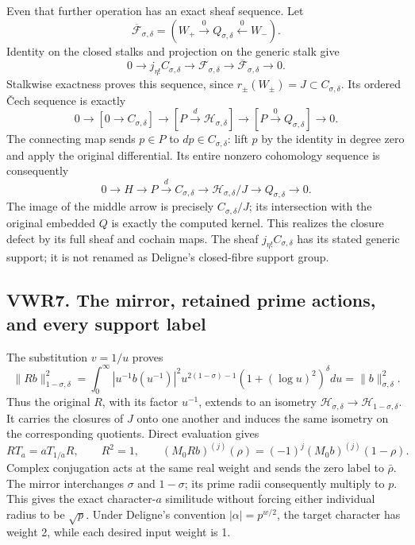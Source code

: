 Even that further operation has an exact sheaf sequence. Let \[
\overline{\mathcal F}_{\sigma,\delta}
=(W_+\xrightarrow0 Q_{\sigma,\delta}\xleftarrow0 W_-).
\] Identity on the closed stalks and projection on the generic stalk
give \[
0\longrightarrow j_{\eta!}C_{\sigma,\delta}
\longrightarrow\mathcal F_{\sigma,\delta}
\longrightarrow\overline{\mathcal F}_{\sigma,\delta}
\longrightarrow0.
\tag{VWR6.5}
\] Stalkwise exactness proves this sequence, since
\(r_\pm(W_\pm)=J\subset C_{\sigma,\delta}\). Its ordered Čech sequence
is exactly \[
0\to[0\to C_{\sigma,\delta}]
\to[P\xrightarrow d\mathcal H_{\sigma,\delta}]
\to[P\xrightarrow0Q_{\sigma,\delta}]\to0.
\] The connecting map sends \(p\in P\) to \(dp\in C_{\sigma,\delta}\):
lift \(p\) by the identity in degree zero and apply the original
differential. Its entire nonzero cohomology sequence is consequently \[
0\to H\to P\xrightarrow d C_{\sigma,\delta}
\longrightarrow\mathcal H_{\sigma,\delta}/J
\longrightarrow Q_{\sigma,\delta}\to0.
\tag{VWR6.6}
\] The image of the middle arrow is precisely \(C_{\sigma,\delta}/J\);
its intersection with the original embedded \(Q\) is exactly the
computed kernel. This realizes the closure defect by its full sheaf and
cochain maps. The sheaf \(j_{\eta!}C_{\sigma,\delta}\) has its stated
generic support; it is not renamed as Deligne's closed-fibre support
group.

\subsection{VWR7. The mirror, retained prime actions, and every support
label}\label{vwr7.-the-mirror-retained-prime-actions-and-every-support-label}

The substitution \(v=1/u\) proves \[
\|Rb\|_{1-\sigma,\delta}^2
=\int_0^\infty|u^{-1}b(u^{-1})|^2u^{2(1-\sigma)-1}
 (1+(\log u)^2)^\delta du
=\|b\|_{\sigma,\delta}^2.
\tag{VWR7.1}
\] Thus the original \(R\), with its factor \(u^{-1}\), extends to an
isometry \(\mathcal H_{\sigma,\delta}\to\mathcal H_{1-\sigma,\delta}\).
It carries the closures of \(J\) onto one another and induces the same
isometry on the corresponding quotients. Direct evaluation gives \[
RT_a=aT_{1/a}R,\qquad R^2=1,
\qquad (M_0Rb)^{(j)}(\rho)=(-1)^j(M_0b)^{(j)}(1-\rho).
\tag{VWR7.2}
\] Complex conjugation acts at the same real weight and sends the zero
label to \(\bar\rho\). The mirror interchanges \(\sigma\) and
\(1-\sigma\); its prime radii consequently multiply to \(p\). This gives
the exact character-\(a\) similitude without forcing either individual
radius to be \(\sqrt p\). Under Deligne's convention
\(|\alpha|=p^{w/2}\), the target character has weight 2, while each
desired input weight is 1.

